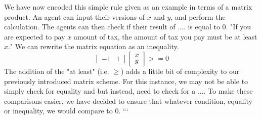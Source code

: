 We have now encoded this simple rule given as an example in terms of a matrix product. An agent can input their versions of $x$ and $y$, and perform the calculation.
The agents can then check if their result of .... is equal to $0$.
\linebreak
\linebreak
"If you are expected to pay $x$ amount of tax, the amount of tax you pay must be at least $x$."
\linebreak
\linebreak
We can rewrite the matrix equation as an inequality.
\[
    \begin{bmatrix}
        -1 & 1
    \end{bmatrix}
    \begin{bmatrix}
        x \\
        y
    \end{bmatrix}   
    >= 0  
\]
The addition of the "at least" (i.e. $\geq$) adds a little bit of complexity to our previously introduced matrix scheme. For this instance, we may not be able to simply check for equality and but instead, need to check for a ....
To make these comparisons easier, we have decided to ensure that whatever condition, equality or inequality, we would compare to $0$. ```

